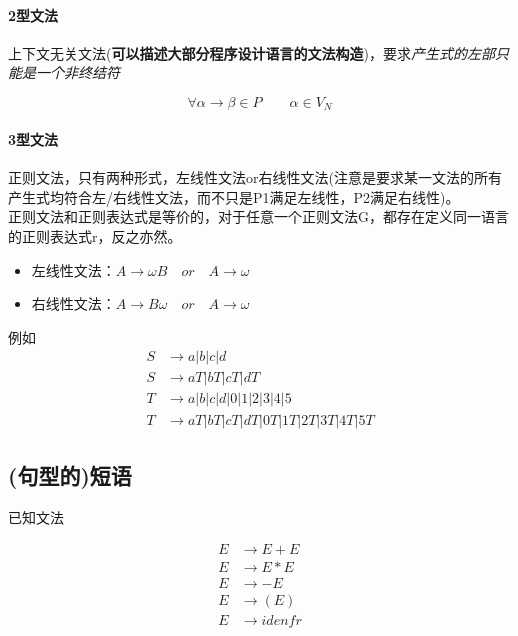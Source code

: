 \documentclass[UTF8]{ctexart} %
\begin{document}
\paragraph{2型文法} 上下文无关文法(\textbf{可以描述大部分程序设计语言的文法构造})，要求\emph{产生式的左部只能是一个非终结符}

\begin{equation}
    \forall \alpha \rightarrow \beta \in P \qquad \alpha \in V_N
\end{equation}

\paragraph{3型文法} 正则文法，只有两种形式，左线性文法or右线性文法(注意是要求某一文法的所有产生式均符合左/右线性文法，而不只是P1满足左线性，P2满足右线性)。\\
正则文法和正则表达式是等价的，对于任意一个正则文法G，都存在定义同一语言的正则表达式r，反之亦然。

\begin{itemize}
    \item 左线性文法：$A\rightarrow \omega B \quad or \quad A\rightarrow \omega $
    \item 右线性文法：$A\rightarrow B \omega \quad or \quad A\rightarrow \omega $
\end{itemize}

例如
\begin{align*}
    S & \rightarrow a|b|c|d                       \\
    S & \rightarrow aT|bT|cT|dT                   \\
    T & \rightarrow a|b|c|d|0|1|2|3|4|5           \\
    T & \rightarrow aT|bT|cT|dT|0T|1T|2T|3T|4T|5T
\end{align*}

\subsection{(句型的)短语}

已知文法

\begin{align*}
    E & \rightarrow E+E    \\
    E & \rightarrow E*E    \\
    E & \rightarrow -E     \\
    E & \rightarrow (E)    \\
    E & \rightarrow idenfr \\
\end{align*}
\end{document}
